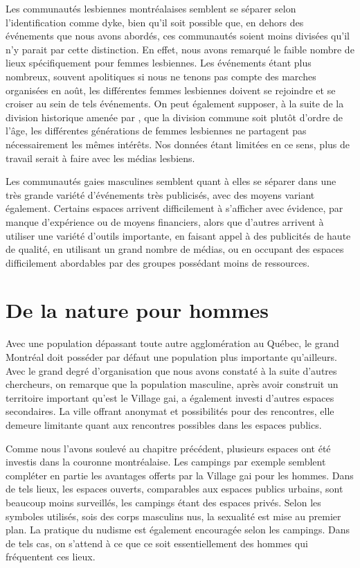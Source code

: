 Les communautés lesbiennes montréalaises semblent se séparer selon l'identification comme dyke, bien qu'il soit possible que, en dehors des événements que nous avons abordés, ces communautés soient moins divisées qu'il n'y parait par cette distinction.
En effet, nous avons remarqué le faible nombre de lieux spécifiquement pour femmes lesbiennes.
Les événements étant plus nombreux, souvent apolitiques si nous ne tenons pas compte des marches organisées en août, les différentes femmes lesbiennes doivent se rejoindre et se croiser au sein de tels événements.
On peut également supposer, à la suite de la division historique amenée par \citet{Giraud2014}, que la division commune soit plutôt d'ordre de l'âge, les différentes générations de femmes lesbiennes ne partagent pas nécessairement les mêmes intérêts.
Nos données étant limitées en ce sens, plus de travail serait à faire avec les médias lesbiens.

Les communautés gaies masculines semblent quant à elles se séparer dans une très grande variété d'événements très publicisés, avec des moyens variant également.
Certains espaces arrivent difficilement à s'afficher avec évidence, par manque d'expérience ou de moyens financiers, alors que d'autres arrivent à utiliser une variété d'outils importante, en faisant appel à des publicités de haute de qualité, en utilisant un grand nombre de médias, ou en occupant des espaces difficilement abordables par des groupes possédant moins de ressources.

\section{De la nature pour hommes}
\label{sec:de_la_nature_pour_hommes}
Avec une population dépassant toute autre agglomération au Québec, le grand Montréal doit posséder par défaut une population \lgbt{} plus importante qu'ailleurs.
Avec le grand degré d'organisation que nous avons constaté à la suite d'autres chercheurs, on remarque que la population masculine, après avoir construit un territoire important qu'est le Village gai, a également investi d'autres espaces secondaires.
La ville offrant anonymat et possibilités pour des rencontres, elle demeure limitante quant aux rencontres possibles dans les espaces publics.

Comme nous l'avons soulevé au chapitre précédent, plusieurs espaces ont été investis dans la couronne montréalaise.
Les campings par exemple semblent compléter en partie les avantages offerts par la Village gai pour les hommes.
Dans de tels lieux, les espaces ouverts, comparables aux espaces publics urbains, sont beaucoup moins surveillés, les campings étant  des espaces privés.
Selon les symboles utilisés, sois des corps masculins nus, la sexualité est mise au premier plan.
La pratique du nudisme est également encouragée selon les campings.
Dans de tels cas, on s'attend à ce que ce soit essentiellement des hommes qui fréquentent ces lieux.

